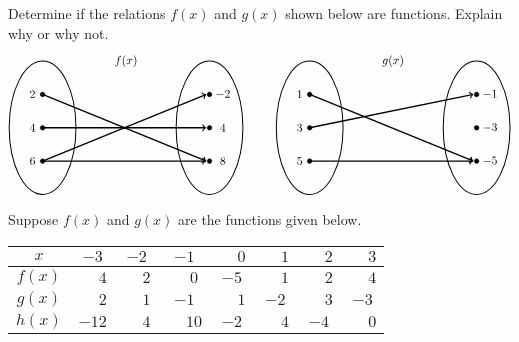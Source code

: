 \documentclass[11pt,letterpaper]{article}
\begin{document}
\prob Determine if the relations $f(x)$ and $g(x)$ shown below are functions. Explain why or why not. 
	\[
	\begin{tikzpicture}
	\node at (2.5,2) {$f(x)$};
	\draw[line width=0.03cm] (0,0) circle (1 and 2);
	\draw[line width=0.03cm] (5,0) circle (1 and 2);
	
	\draw[fill=black] (0,1) circle (0.07);
	\draw[fill=black] (0,0) circle (0.07);
	\draw[fill=black] (0,-1) circle (0.07);
	
	\draw[fill=black] (5,1) circle (0.07);
	\draw[fill=black] (5,0) circle (0.07);
	\draw[fill=black] (5,-1) circle (0.07);
	
	\draw[line width=0.04cm,->] (0,1) -- (4.9,-1);
	\draw[line width=0.04cm,->] (0,0) -- (4.9,0);
	\draw[line width=0.04cm,->] (0,-1) -- (4.9,1);
	\draw[line width=0.04cm,->] (0,-1) -- (4.9,-1);
	
	\node at (-0.3,1) {$2$};
	\node at (-0.3,0) {$4$};
	\node at (-0.3,-1) {$6$};
	
	\node at (5.4,1) {$-2$};
	\node at (5.4,0) {$4$};
	\node at (5.4,-1) {$8$};
	
	\tikzset{shift={(8,0)}}
	\node at (2.5,2) {$g(x)$};
	\draw[line width=0.03cm] (0,0) circle (1 and 2);
	\draw[line width=0.03cm] (5,0) circle (1 and 2);
	
	\draw[fill=black] (0,1) circle (0.07);
	\draw[fill=black] (0,0) circle (0.07);
	\draw[fill=black] (0,-1) circle (0.07);
	
	\draw[fill=black] (5,1) circle (0.07);
	\draw[fill=black] (5,0) circle (0.07);
	\draw[fill=black] (5,-1) circle (0.07);
	
	\draw[line width=0.04cm,->] (0,1) -- (4.9,-1);
	\draw[line width=0.04cm,->] (0,0) -- (4.9,1);
	\draw[line width=0.04cm,->] (0,-1) -- (4.9,-1);
	
	\node at (-0.3,1) {$1$};
	\node at (-0.3,0) {$3$};
	\node at (-0.3,-1) {$5$};
	
	\node at (5.4,1) {$-1$};
	\node at (5.4,0) {$-3$};
	\node at (5.4,-1) {$-5$};
	\end{tikzpicture}
	\] \pspace


\prob Suppose $f(x)$ and $g(x)$ are the functions given below. 
        \begin{table}[!ht]
        \centering
        \begin{tabular}{| c || c | c | c | c | c | c | c |} \hline
	$x$ & $-3$ & $-2$ & $-1$ & $\phantom{-}0$ & $\phantom{-}1$ & $\phantom{-}2$ & $\phantom{-}3$ \\ \hline
	$f(x)$ & $\phantom{-1}4$ & $\phantom{-}2$ & $\phantom{-}0$ & $-5$ & $\phantom{-}1$ & $\phantom{-}2$ & $\phantom{-}4$ \\ \hline
	$g(x)$ & $\phantom{-1}2$ & $\phantom{-}1$ & $-1$ & $\phantom{-}1$ & $-2$ & $\phantom{-}3$ & $-3$ \\ \hline
	$h(x)$ & $-12$ & $\phantom{-}4$ & $\phantom{-}10$ & $-2$ & $\phantom{-}4$ & $-4$ & $\phantom{-}0$ \\ \hline
        \end{tabular}
        \end{table}
\end{document}
